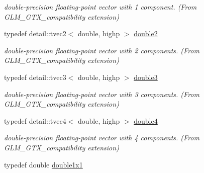 \begin{CompactItemize}
\begin{CompactList}\small\item\em double-precision floating-point vector with 1 component. (From GLM\_\-GTX\_\-compatibility extension) \item\end{CompactList}\item 
\hypertarget{group__gtx__compatibility_g227d30a4fa630c9e3fb6c7ea87250c62}{
typedef detail::tvec2$<$ double, highp $>$ \hyperlink{group__gtx__compatibility_g227d30a4fa630c9e3fb6c7ea87250c62}{double2}}
\label{group__gtx__compatibility_g227d30a4fa630c9e3fb6c7ea87250c62}

\begin{CompactList}\small\item\em double-precision floating-point vector with 2 components. (From GLM\_\-GTX\_\-compatibility extension) \item\end{CompactList}\item 
\hypertarget{group__gtx__compatibility_g3b94d4a19ca0272cad6e025fc5150d06}{
typedef detail::tvec3$<$ double, highp $>$ \hyperlink{group__gtx__compatibility_g3b94d4a19ca0272cad6e025fc5150d06}{double3}}
\label{group__gtx__compatibility_g3b94d4a19ca0272cad6e025fc5150d06}

\begin{CompactList}\small\item\em double-precision floating-point vector with 3 components. (From GLM\_\-GTX\_\-compatibility extension) \item\end{CompactList}\item 
\hypertarget{group__gtx__compatibility_g1edf736b418528a2fc87d826f7697b9d}{
typedef detail::tvec4$<$ double, highp $>$ \hyperlink{group__gtx__compatibility_g1edf736b418528a2fc87d826f7697b9d}{double4}}
\label{group__gtx__compatibility_g1edf736b418528a2fc87d826f7697b9d}

\begin{CompactList}\small\item\em double-precision floating-point vector with 4 components. (From GLM\_\-GTX\_\-compatibility extension) \item\end{CompactList}\item 
\hypertarget{group__gtx__compatibility_g1c87d3042377335eb050a20ab0ec148a}{
typedef double \hyperlink{group__gtx__compatibility_g1c87d3042377335eb050a20ab0ec148a}{double1x1}}
\label{group__gtx__compatibility_g1c87d3042377335eb050a20ab0ec148a}


\end{CompactItemize}
